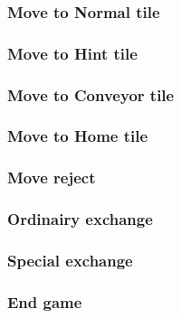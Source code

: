 	\subsubsection{Move to Normal tile}
	

	\subsubsection{Move to Hint tile}
	

	\subsubsection{Move to Conveyor tile}
	

	\subsubsection{Move to Home tile}
	


	\subsubsection{Move reject}
	


	\subsubsection{Ordinairy exchange}
	
	
	\subsubsection{Special exchange}
	
	
	\subsubsection{End game}
	
